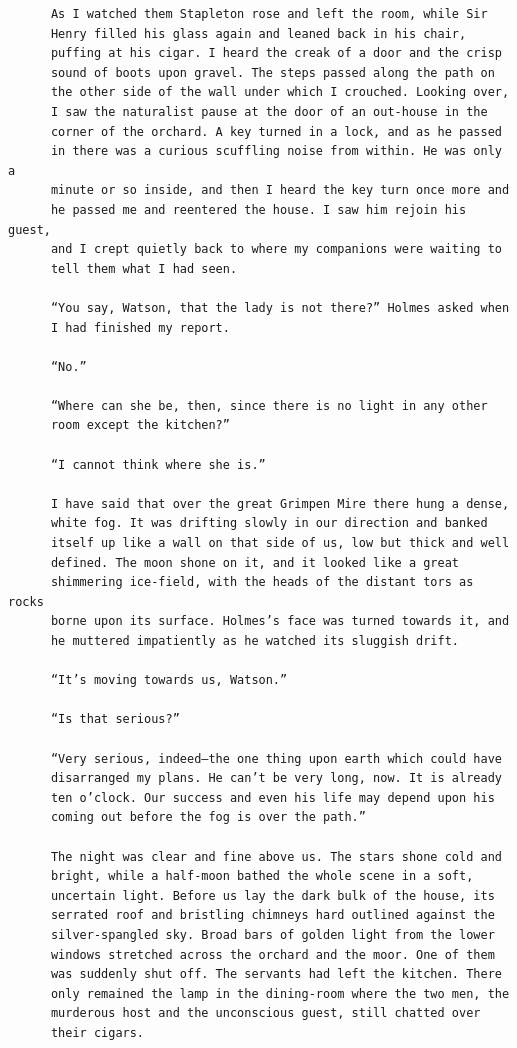 \documentclass{article}
\begin{document}
\begin{verbatim}
      As I watched them Stapleton rose and left the room, while Sir
      Henry filled his glass again and leaned back in his chair,
      puffing at his cigar. I heard the creak of a door and the crisp
      sound of boots upon gravel. The steps passed along the path on
      the other side of the wall under which I crouched. Looking over,
      I saw the naturalist pause at the door of an out-house in the
      corner of the orchard. A key turned in a lock, and as he passed
      in there was a curious scuffling noise from within. He was only a
      minute or so inside, and then I heard the key turn once more and
      he passed me and reentered the house. I saw him rejoin his guest,
      and I crept quietly back to where my companions were waiting to
      tell them what I had seen.

      “You say, Watson, that the lady is not there?” Holmes asked when
      I had finished my report.

      “No.”

      “Where can she be, then, since there is no light in any other
      room except the kitchen?”

      “I cannot think where she is.”

      I have said that over the great Grimpen Mire there hung a dense,
      white fog. It was drifting slowly in our direction and banked
      itself up like a wall on that side of us, low but thick and well
      defined. The moon shone on it, and it looked like a great
      shimmering ice-field, with the heads of the distant tors as rocks
      borne upon its surface. Holmes’s face was turned towards it, and
      he muttered impatiently as he watched its sluggish drift.

      “It’s moving towards us, Watson.”

      “Is that serious?”

      “Very serious, indeed—the one thing upon earth which could have
      disarranged my plans. He can’t be very long, now. It is already
      ten o’clock. Our success and even his life may depend upon his
      coming out before the fog is over the path.”

      The night was clear and fine above us. The stars shone cold and
      bright, while a half-moon bathed the whole scene in a soft,
      uncertain light. Before us lay the dark bulk of the house, its
      serrated roof and bristling chimneys hard outlined against the
      silver-spangled sky. Broad bars of golden light from the lower
      windows stretched across the orchard and the moor. One of them
      was suddenly shut off. The servants had left the kitchen. There
      only remained the lamp in the dining-room where the two men, the
      murderous host and the unconscious guest, still chatted over
      their cigars.


\end{verbatim}
\end{document}
